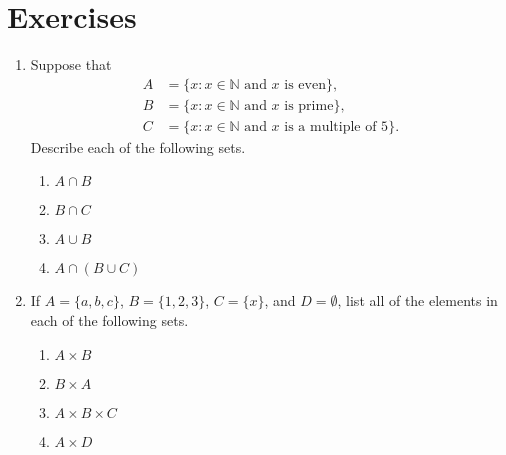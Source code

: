  
\section*{Exercises}
\exrule
 
{\small
\begin{enumerate}

\item
Suppose that
\begin{align*}
A & = \{ x : x \in \mathbb N \text{ and } x \text{ is even} \}, \\
B & = \{x : x \in \mathbb N \text{ and } x \text{ is prime}\}, \\
C & = \{ x : x \in \mathbb N \text{ and } x \text{ is a multiple of 5}\}.
\end{align*}
Describe each of the following sets. 
\begin{multicols}{2}
\begin{enumerate}

\item
$A \cap B$

\item
$B \cap C$

\item
$A \cup B$

\item
$A \cap (B \cup C)$

\end{enumerate}
\end{multicols}
 
\item
If $A = \{ a, b, c \}$, $B = \{ 1, 2, 3 \}$, $C = \{ x \}$, and $D = \emptyset$, list all of the elements in each of the following sets. 
\begin{multicols}{2}
\begin{enumerate}

\item
$A \times B$

\item
$B \times A$

\item
$A \times B \times C$

\item
$A \times D$


\end{enumerate}
\end{multicols}
\end{enumerate}}
